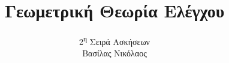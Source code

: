 \documentclass[a4paper,11pt]{article}
\begin{document}
\title{Γεωμετρική Θεωρία Ελέγχου}
\author{2\textsuperscript{η} Σειρά Ασκήσεων\\Βασίλας Νικόλαος}
\maketitle











\end{document}
